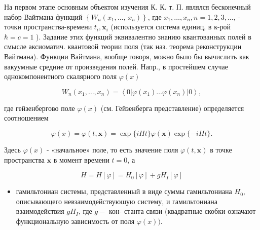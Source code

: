\documentclass[10pt]{article}
\begin{document}
На первом этапе основным объектом изучения К. К. т. П. являлся бесконечный набор Вайтмана функций $\left\{W_{n}\left(x_{1}, \ldots\right.\right.$, $\left.\left.x_{n}\right)\right\}$, где $x_{1}, \ldots, x_{n}, n=1,2,3, \ldots$, - точки пространства-времени $t_{i}, \boldsymbol{x}_{i}$ (используется система единиц, в к-рой $\hbar=c=1$ ). Задание этих функций эквивалентно знанию квантованных полей в смысле аксиоматич. квантовой теории поля (так наз. теорема реконструкции Вайтмана). Функции Вайтмана, вообще говоря, можно было бы вычислить как вакуумные средние от произведения полей. Напр., в простейшем случае однокомпонентного скалярного поля $\varphi(x)$



\[

W_{n}\left(x_{1}, \ldots, x_{n}\right)=\left\langle 0\left|\varphi\left(x_{1}\right) \ldots \varphi\left(x_{n}\right)\right| 0\right\rangle,

\]



где гейзенбергово поле $\varphi(x)$ (см. Гейзенберга представление) определяется соотношением



\[

\varphi(x)=\varphi(t, \boldsymbol{x})=\exp \{i H t\} \varphi(\boldsymbol{x}) \exp \{-i H t\} .

\]



Здесь $\varphi(x)$ - «начальное» поле, то есть значение поля $\varphi(t, \boldsymbol{x})$ в точке пространства $\boldsymbol{x}$ в момент времени $t=0$, а



\[

H=H[\varphi]=H_{0}[\varphi]+g H_{I}[\varphi]

\]



\begin{itemize}

  \item гамильтониан системы, представленный в виде суммы гамильтониана $H_{0}$, описывающего невзаимодействуюшую систему, и гамильтониана взаимодействия $g H_{I}$, где $g-$ кон- станта связи (квадратные скобки означают функциональную зависимость от поля $\varphi(x))$.

\end{itemize}
\end{document}
